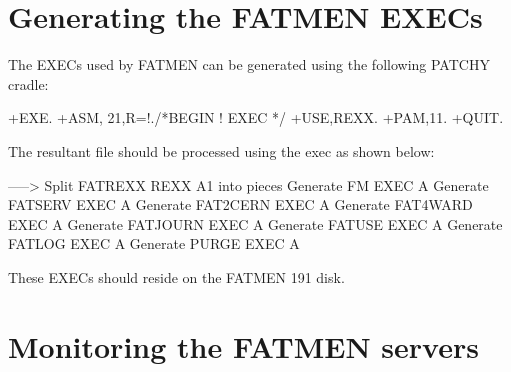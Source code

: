 \section{Generating the FATMEN EXECs}
\par
The EXECs used by FATMEN can be generated using the following PATCHY
cradle:
\begin{XMP}
+EXE.
+ASM, 21,R=!./*BEGIN ! EXEC */
+USE,REXX.
+PAM,11.
+QUIT.
\end{XMP}
\par
The resultant file should be processed using the  exec
as shown below:
\begin{XMP}
-----> Split FATREXX REXX A1 into pieces
Generate FM EXEC A
Generate FATSERV EXEC A
Generate FAT2CERN EXEC A
Generate FAT4WARD EXEC A
Generate FATJOURN EXEC A
Generate FATUSE EXEC A
Generate FATLOG EXEC A
Generate PURGE EXEC A
\end{XMP}

These EXECs should reside on the FATMEN 191 disk.
\section{Monitoring the FATMEN servers}

